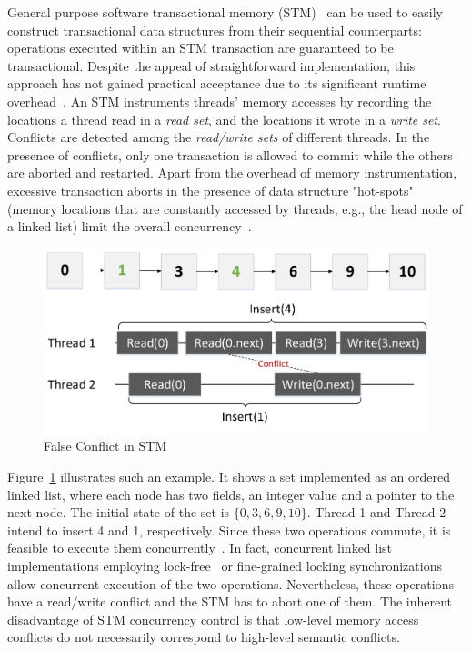 \documentclass[10pt,conference,compsocconf]{IEEEtran}
\begin{document}
General purpose software transactional memory (STM)~\cite{shavit1997software,herlihy2003software} can be used to easily construct transactional data structures from their sequential counterparts: operations executed within an STM transaction are guaranteed to be transactional.
Despite the appeal of straightforward implementation, this approach has not gained practical acceptance due to its significant runtime overhead~\cite{cascaval2008software}.
An STM instruments threads' memory accesses by recording the locations a thread read in a \emph{read set}, and the locations it wrote in a \emph{write set}. 
Conflicts are detected among the \emph{read/write sets} of different threads. 
In the presence of conflicts, only one transaction is allowed to commit while the others are aborted and restarted.
Apart from the overhead of memory instrumentation, excessive transaction aborts in the presence of data structure "hot-spots" (memory locations that are constantly accessed by threads, e.g., the head node of a linked list) limit the overall concurrency~\cite{herlihy2008transactional}.
\begin{figure}[h]
    \centering
    \includegraphics[width=0.8\columnwidth]{figure/stmconflict.pdf}
    \caption{False Conflict in STM}
    \label{fig:stmconflict}
\end{figure}
Figure~\ref{fig:stmconflict} illustrates such an example.
It shows a set implemented as an ordered linked list, where each node has two fields, an integer value and a pointer to the next node.
The initial state of the set is $\{0,3,6,9,10\}$.
Thread 1 and Thread 2 intend to insert 4 and 1, respectively.
Since these two operations commute, it is feasible to execute them concurrently~\cite{clements2015scalable}.
In fact, concurrent linked list implementations employing lock-free~\cite{michael2002high} or fine-grained locking synchronizations~\cite{bayer1977concurrency} allow concurrent execution of the two operations.
Nevertheless, these operations have a read/write conflict and the STM has to abort one of them. 
The inherent disadvantage of STM concurrency control is that low-level memory access conflicts do not necessarily correspond to high-level semantic conflicts.
\end{document}
